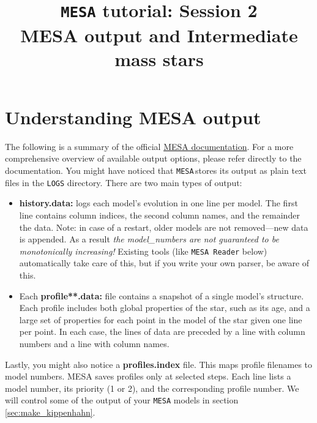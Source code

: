 \documentclass[11pt,a4paper]{article}
\newcommand{\MESA}{\texttt{MESA}\,}
\begin{document}
\title{
    \textbf{\texttt{MESA} tutorial: Session 2} \\
    \textbf{\Large MESA output and Intermediate mass stars}
}
\date{}
\maketitle
\vspace{-1cm}



\section{Understanding MESA output}

The following is a summary of the official \href{https://docs.mesastar.org/en/latest/using_mesa/output.html}{MESA documentation}. For a more comprehensive overview of available output options, please refer directly to the documentation.
%
You might have noticed that \MESA stores its output as plain text files in the \texttt{LOGS} directory. 
%
There are two main types of output:

\begin{itemize}
  \item \textbf{history.data:} logs each model's evolution in one line per model. The first line contains column indices, the second column names, and the remainder the data. Note: in case of a restart, older models are not removed—new data is appended. As a result \textit{the model\_numbers are not guaranteed to be monotonically increasing!} Existing tools (like \texttt{MESA Reader} below) automatically take care of this, but if you write your own parser, be aware of this.
  
  \item Each \textbf{profile**.data:} file contains a snapshot of a single model's structure. Each profile includes both global properties of the star, such as its age, and a large set of properties for each point in the model of the star given one line per point. In each case, the lines of data are preceded by a line with column numbers and a line with column names. 

\end{itemize}

\noindent Lastly, you might also notice a \textbf{profiles.index} file. This maps profile filenames to model numbers. MESA saves profiles only at selected steps. Each line lists a model number, its priority (1 or 2), and the corresponding profile number.
%
We will control some of the output of your \texttt{MESA} models in section \ref{sec:make_kippenhahn}.
\end{document}
